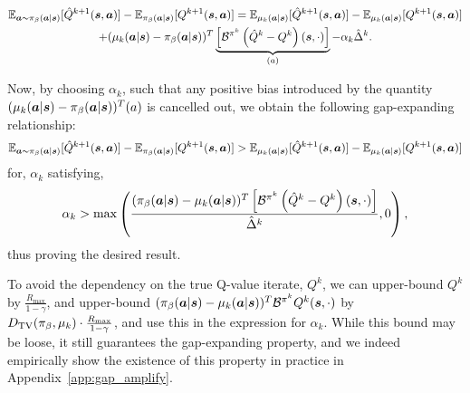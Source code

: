 \begin{multline*}
    \mathbb{E}_{\boldsymbol{a} \sim {\pi_\beta}(\boldsymbol{a}|\boldsymbol{s})}[\hat{Q}^{k+1}(\boldsymbol{s}, \boldsymbol{a})] - \mathbb{E}_{{\pi_\beta}(\boldsymbol{a}|\boldsymbol{s})}[{Q}^{k+1}(\boldsymbol{s}, \boldsymbol{a})] = \mathbb{E}_{\mu_k(\boldsymbol{a}|\boldsymbol{s})}[\hat{Q}^{k+1}(\boldsymbol{s}, \boldsymbol{a})] - \mathbb{E}_{\mu_k(\boldsymbol{a}|\boldsymbol{s})}[{Q}^{k+1}(\boldsymbol{s}, \boldsymbol{a})]\\
    + (\mu_k(\boldsymbol{a}|\boldsymbol{s}) - {\pi_\beta}(\boldsymbol{a}|\boldsymbol{s}))^T \underbrace{\left[ \mathcal{B}^{\pi^k} \left( \hat{Q}^k - Q^k \right)(\boldsymbol{s}, \cdot) \right]}_{(a)}- \alpha_k \hat{\Delta}^k.
\end{multline*}

Now, by choosing $\alpha_k$, such that any positive bias introduced by the quantity $(\mu_k(\boldsymbol{a}|\boldsymbol{s}) - {\pi_\beta}(\boldsymbol{a}|\boldsymbol{s}))^T (a)$ is cancelled out, we obtain the following gap-expanding relationship:
\begin{equation*}
    \mathbb{E}_{\boldsymbol{a} \sim {\pi_\beta}(\boldsymbol{a}|\boldsymbol{s})}[\hat{Q}^{k+1}(\boldsymbol{s}, \boldsymbol{a})] - \mathbb{E}_{{\pi_\beta}(\boldsymbol{a}|\boldsymbol{s})}[{Q}^{k+1}(\boldsymbol{s}, \boldsymbol{a})] > \mathbb{E}_{\mu_k(\boldsymbol{a}|\boldsymbol{s})}[\hat{Q}^{k+1}(\boldsymbol{s}, \boldsymbol{a})] - \mathbb{E}_{\mu_k(\boldsymbol{a}|\boldsymbol{s})}[{Q}^{k+1}(\boldsymbol{s}, \boldsymbol{a})]
\end{equation*}
for, $\alpha_k$ satisfying, 
\begin{equation*}
    \alpha_k > \max \left(\frac{({\pi_\beta}(\boldsymbol{a}|\boldsymbol{s}) - \mu_k(\boldsymbol{a}|\boldsymbol{s}))^T \left[ \mathcal{B}^{\pi^k} \left( \hat{Q}^k - Q^k \right)(\boldsymbol{s}, \cdot) \right]}{\hat{\Delta}^k}, 0\right),
\end{equation*}
thus proving the desired result.

To avoid the dependency on the true Q-value iterate, ${Q}^k$, we can upper-bound $Q^k$ by $\frac{R_{\max}}{1 - \gamma}$, and upper-bound $({\pi_\beta}(\boldsymbol{a}|\boldsymbol{s}) - \mu_k(\boldsymbol{a}|\boldsymbol{s}))^T \mathcal{B}^{\pi^k} Q^k (\boldsymbol{s}, \cdot)$ by $D_{\mathrm{TV}}({\pi_\beta}, \mu_k) \cdot \frac{R_{\max}}{1 - \gamma}$, and use this in the expression for $\alpha_k$. While this bound may be loose, it still guarantees the gap-expanding property, and we indeed empirically show the existence of this property in practice in Appendix~\ref{app:gap_amplify}. 


